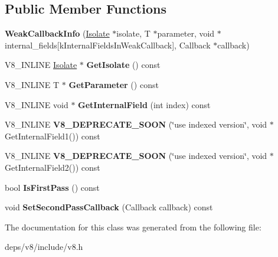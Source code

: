 \subsection*{Public Member Functions}
\begin{DoxyCompactItemize}
\item 
\hypertarget{classv8_1_1_weak_callback_info_a0863d1a5dba908ef4ac42298be4ee402}{}{\bfseries Weak\+Callback\+Info} (\hyperlink{classv8_1_1_isolate}{Isolate} $\ast$isolate, T $\ast$parameter, void $\ast$internal\+\_\+fields\mbox{[}k\+Internal\+Fields\+In\+Weak\+Callback\mbox{]}, Callback $\ast$callback)\label{classv8_1_1_weak_callback_info_a0863d1a5dba908ef4ac42298be4ee402}

\item 
\hypertarget{classv8_1_1_weak_callback_info_a5f0fe68cc18853467d3713b1ec48da9a}{}V8\+\_\+\+I\+N\+L\+I\+N\+E \hyperlink{classv8_1_1_isolate}{Isolate} $\ast$ {\bfseries Get\+Isolate} () const \label{classv8_1_1_weak_callback_info_a5f0fe68cc18853467d3713b1ec48da9a}

\item 
\hypertarget{classv8_1_1_weak_callback_info_a515eb1547d96a9813e447e8acfb46a1a}{}V8\+\_\+\+I\+N\+L\+I\+N\+E T $\ast$ {\bfseries Get\+Parameter} () const \label{classv8_1_1_weak_callback_info_a515eb1547d96a9813e447e8acfb46a1a}

\item 
\hypertarget{classv8_1_1_weak_callback_info_ac14e2ded95ad11763a5fdf601e69e004}{}V8\+\_\+\+I\+N\+L\+I\+N\+E void $\ast$ {\bfseries Get\+Internal\+Field} (int index) const \label{classv8_1_1_weak_callback_info_ac14e2ded95ad11763a5fdf601e69e004}

\item 
\hypertarget{classv8_1_1_weak_callback_info_a2928ffa7f6a503c8453af2579f4e7ac2}{}V8\+\_\+\+I\+N\+L\+I\+N\+E {\bfseries V8\+\_\+\+D\+E\+P\+R\+E\+C\+A\+T\+E\+\_\+\+S\+O\+O\+N} (\char`\"{}use indexed version\char`\"{}, void $\ast$Get\+Internal\+Field1()) const \label{classv8_1_1_weak_callback_info_a2928ffa7f6a503c8453af2579f4e7ac2}

\item 
\hypertarget{classv8_1_1_weak_callback_info_a449d58237ae4dbfad8761fc69164c73f}{}V8\+\_\+\+I\+N\+L\+I\+N\+E {\bfseries V8\+\_\+\+D\+E\+P\+R\+E\+C\+A\+T\+E\+\_\+\+S\+O\+O\+N} (\char`\"{}use indexed version\char`\"{}, void $\ast$Get\+Internal\+Field2()) const \label{classv8_1_1_weak_callback_info_a449d58237ae4dbfad8761fc69164c73f}

\item 
\hypertarget{classv8_1_1_weak_callback_info_a679a5a0beedac33631e732b77fa6f9d7}{}bool {\bfseries Is\+First\+Pass} () const \label{classv8_1_1_weak_callback_info_a679a5a0beedac33631e732b77fa6f9d7}

\item 
\hypertarget{classv8_1_1_weak_callback_info_a17590c561d242f1250b4cd4020eb8cd7}{}void {\bfseries Set\+Second\+Pass\+Callback} (Callback callback) const \label{classv8_1_1_weak_callback_info_a17590c561d242f1250b4cd4020eb8cd7}

\end{DoxyCompactItemize}


The documentation for this class was generated from the following file\+:\begin{DoxyCompactItemize}
\item 
deps/v8/include/v8.\+h\end{DoxyCompactItemize}
